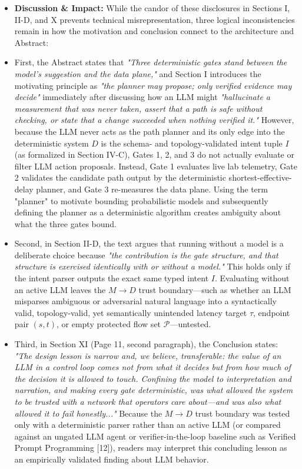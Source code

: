 \documentclass[11pt,a4paper]{article}
\begin{document}
\begin{itemize}[leftmargin=1.8em,itemsep=2pt]
\item \textbf{Discussion \& Impact:} While the candor of these disclosures in Sections I, II-D, and X prevents technical misrepresentation, three logical inconsistencies remain in how the motivation and conclusion connect to the architecture and Abstract:
\item First, the Abstract states that \emph{"Three deterministic gates stand between the model's suggestion and the data plane,"} and Section I introduces the motivating principle as \emph{"the planner may propose; only verified evidence may decide"} immediately after discussing how an LLM might \emph{"hallucinate a measurement that was never taken, assert that a path is safe without checking, or state that a change succeeded when nothing verified it."} However, because the LLM never acts as the path planner and its only edge into the deterministic system $D$ is the schema- and topology-validated intent tuple $I$ (as formalized in Section IV-C), Gates 1, 2, and 3 do not actually evaluate or filter LLM action proposals. Instead, Gate 1 evaluates live lab telemetry, Gate 2 validates the candidate path output by the deterministic shortest-effective-delay planner, and Gate 3 re-measures the data plane. Using the term "planner" to motivate bounding probabilistic models and subsequently defining the planner as a deterministic algorithm creates ambiguity about what the three gates bound.
\item Second, in Section II-D, the text argues that running without a model is a deliberate choice because \emph{"the contribution is the gate structure, and that structure is exercised identically with or without a model."} This holds only if the intent parser outputs the exact same typed intent $I$. Evaluating without an active LLM leaves the $M \to D$ trust boundary—such as whether an LLM misparses ambiguous or adversarial natural language into a syntactically valid, topology-valid, yet semantically unintended latency target $\tau$, endpoint pair $(s, t)$, or empty protected flow set $\mathcal{P}$—untested.
\item Third, in Section XI (Page 11, second paragraph), the Conclusion states: \emph{"The design lesson is narrow and, we believe, transferable: the value of an LLM in a control loop comes not from what it decides but from how much of the decision it is allowed to touch. Confining the model to interpretation and narration, and making every gate deterministic, was what allowed the system to be trusted with a network that operators care about—and was also what allowed it to fail honestly..."} Because the $M \to D$ trust boundary was tested only with a deterministic parser rather than an active LLM (or compared against an ungated LLM agent or verifier-in-the-loop baseline such as Verified Prompt Programming [12]), readers may interpret this concluding lesson as an empirically validated finding about LLM behavior.

\end{itemize}
\end{document}
